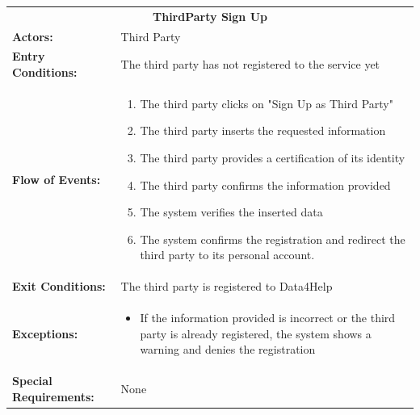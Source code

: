 \begin{table}[H]
	\centering
	{\renewcommand{\arraystretch}{1.5}%
		\begin{tabular}{|@{\hspace{2em}} p{4cm} @{}| p{11cm} @{\qquad}|}
			\cline{1-2}
			\multicolumn{2}{|c|}{\textbf{ThirdParty Sign Up}} \\ \cline{1-2}
			\textbf{Actors:} & Third Party \\ \cline{1-2}
			\textbf{Entry Conditions:} & The third party has not registered to the service yet \\ \cline{1-2}
			\textbf{Flow of Events:} & 
			\begin{enumerate}[itemsep=-0.2em, topsep=0em]
				\item The third party clicks on "Sign Up as Third Party"
				\item The third party inserts the requested information
				\item The third party provides a certification of its identity
				\item The third party confirms the information provided
				\item The system verifies the inserted data
				\item The system confirms the registration and redirect the third party to its personal account.
			\end{enumerate}\\ \cline{1-2}
			\textbf{Exit Conditions:} & The third party is registered to Data4Help \\ \hline
			\textbf{Exceptions:} & 
			\begin{itemize}[itemsep=-0.2em, topsep=0em]
				\item If the information provided is incorrect or the third party is already registered, the system shows a warning and denies the registration
			\end{itemize} \\ \hline
			\textbf{Special Requirements:} & None\\ \hline
	\end{tabular}} \quad
\end{table}

